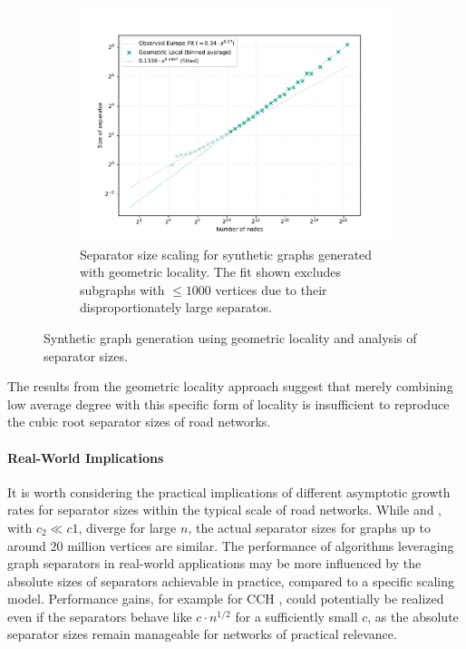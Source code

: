 \begin{figure}[tbhp]
\begin{subfigure}{0.55\linewidth}
        \includegraphics[width=\linewidth]{graphics/sep_local_embedding.pdf}
        \caption{Separator size scaling for synthetic graphs generated with geometric locality. The fit shown excludes subgraphs with \( \le 1000 \) vertices due to their disproportionately large separatos. }
        \label{fig:geometric_locality_sep_plot}
    \end{subfigure}
    \caption{Synthetic graph generation using geometric locality and analysis of separator sizes. }
    \label{fig:geometric_locality_separators}
\end{figure}

The results from the geometric locality approach suggest that merely combining low average degree with this specific form of locality is insufficient to reproduce the cubic root separator sizes of road networks.

\paragraph{Real-World Implications}

It is worth considering the practical implications of different asymptotic growth rates for separator sizes within the typical scale of road networks.
While  and , with \(c_2 \ll c1\), diverge for large \(n\), the actual separator sizes for graphs up to around 20 million vertices are similar.
The performance of algorithms leveraging graph separators in real-world applications may be more influenced by the absolute sizes of separators achievable in practice, compared to a specific scaling model.
Performance gains, for example for CCH \cite{dibbelt_customizable_2016}, could potentially be realized even if the separators behave like \(c \cdot n^{1/2}\) for a sufficiently small \(c\), as the absolute separator sizes remain manageable for networks of practical relevance.

